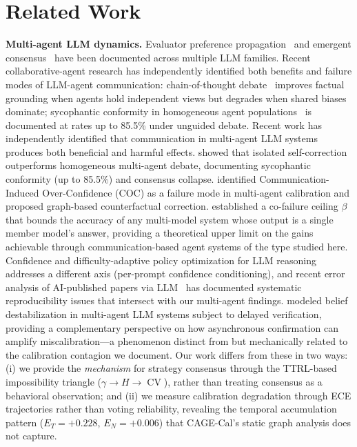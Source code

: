 \documentclass[11pt]{article}
\DeclareMathOperator{\CV}{CV}
\begin{document}
\section{Related Work}

\textbf{Multi-agent LLM dynamics.} Evaluator preference propagation~\cite{liu2026mmepc} and emergent consensus~\cite{park2023generative} have been documented across multiple LLM families. Recent collaborative-agent research has independently identified both benefits and failure modes of LLM-agent communication: chain-of-thought debate~\cite{du2024improving,li2023camel} improves factual grounding when agents hold independent views but degrades when shared biases dominate; sycophantic conformity in homogeneous agent populations~\cite{bertalanic2026cost} is documented at rates up to 85.5\% under unguided debate. Recent work has independently identified that communication in multi-agent LLM systems produces both beneficial and harmful effects. \citet{bertalanic2026cost} showed that isolated self-correction outperforms homogeneous multi-agent debate, documenting sycophantic conformity (up to 85.5\%) and consensus collapse. \citet{huang2026cagecal} identified Communication-Induced Over-Confidence (COC) as a failure mode in multi-agent calibration and proposed graph-based counterfactual correction. \citet{chen2026combining} established a co-failure ceiling $\beta$ that bounds the accuracy of any multi-model system whose output is a single member model's answer, providing a theoretical upper limit on the gains achievable through communication-based agent systems of the type studied here. Confidence and difficulty-adaptive policy optimization for LLM reasoning~\cite{tmlr260607950} addresses a different axis (per-prompt confidence conditioning), and recent error analysis of AI-published papers via LLM~\cite{tmlr251205925} has documented systematic reproducibility issues that intersect with our multi-agent findings. \citet{itkin2026delayed} modeled belief destabilization in multi-agent LLM systems subject to delayed verification, providing a complementary perspective on how asynchronous confirmation can amplify miscalibration---a phenomenon distinct from but mechanically related to the calibration contagion we document. Our work differs from these in two ways: (i) we provide the \textit{mechanism} for strategy consensus through the TTRL-based impossibility triangle ($\gamma \to H \to \CV$), rather than treating consensus as a behavioral observation; and (ii) we measure calibration degradation through ECE trajectories rather than voting reliability, revealing the temporal accumulation pattern ($E_T = +0.228$, $E_N = +0.006$) that CAGE-Cal's static graph analysis does not capture.
\end{document}
